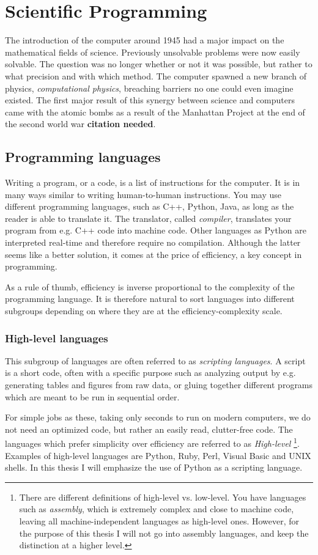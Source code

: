 \chapter{Scientific Programming}

The introduction of the computer around 1945 had a major impact on the mathematical fields of science. Previously unsolvable problems were now easily solvable. The question was no longer whether or not it was possible, but rather to what precision and with which method. The computer spawned a new branch of physics, \textit{computational physics}, breaching barriers no one could even imagine existed. The first major result of this synergy between science and computers came with the atomic bombs as a result of the Manhattan Project at the end of the second world war \textbf{citation needed}.       

\section{Programming languages}

Writing a program, or a code, is a list of instructions for the computer. It is in many ways similar to writing human-to-human instructions. You may use different programming languages, such as C++, Python, Java, as long as the reader is able to translate it. The translator, called \textit{compiler}, translates your program from e.g. C++ code into machine code. Other languages as Python are interpreted real-time and therefore require no compilation. Although the latter seems like a better solution, it comes at the price of efficiency, a key concept in programming. 

As a rule of thumb, efficiency is inverse proportional to the complexity of the programming language. It is therefore natural to sort languages into different subgroups depending on where they are at the efficiency-complexity scale.


\subsection{High-level languages}

This subgroup of languages are often referred to as \textit{scripting languages}. A script is a short code, often with a specific purpose such as analyzing output by e.g. generating tables and figures from raw data, or gluing together different programs which are meant to be run in sequential order.

For simple jobs as these, taking only seconds to run on modern computers, we do not need an optimized code, but rather an easily read, clutter-free code. The languages which prefer simplicity over efficiency are referred to as \textit{High-level} \footnote{There are different definitions of high-level vs. low-level. You have languages such as \textit{assembly}, which is extremely complex and close to machine code, leaving all machine-independent languages as high-level ones. However, for the purpose of this thesis I will not go into assembly languages, and keep the distinction at a higher level.}. Examples of high-level languages are Python, Ruby, Perl, Visual Basic and UNIX shells. In this thesis I will emphasize the use of Python as a scripting language.   


